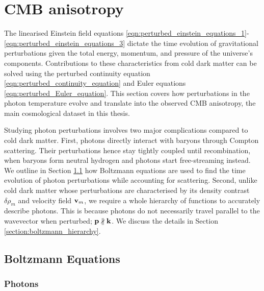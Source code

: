 \section{CMB anisotropy}

The linearised Einstein field equations \eqref{eqn:perturbed_einstein_equations_1}-\eqref{eqn:perturbed_einstein_equations_3} dictate the time evolution of gravitational perturbations given the total energy, momentum, and pressure of the universe's components. Contributions to these characteristics from cold dark matter can be solved using the perturbed continuity equation \eqref{eqn:perturbed_continuity_equation} and Euler equations \eqref{eqn:perturbed_Euler_equation}. This section covers how perturbations in the photon temperature evolve and translate into the observed CMB anisotropy, the main cosmological dataset in this thesis.

Studying photon perturbations involves two major complications compared to cold dark matter. First, photons directly interact with baryons through Compton scattering. Their perturbations hence stay tightly coupled until recombination, when baryons form neutral hydrogen and photons start free-streaming instead. We outline in Section \ref{section:boltzmann_equations} how Boltzmann equations are used to find the time evolution of photon perturbations while accounting for scattering. Second, unlike cold dark matter whose perturbations are characterised by its density contrast $\delta\rho_m$ and velocity field $\mathbf{v}_m$, we require a whole hierarchy of functions to accurately describe photons. This is because photons do not necessarily travel parallel to the wavevector when perturbed; $\mathbf{p} \nparallel \mathbf{k}$. We discuss the details in Section \ref{section:boltzmann_hierarchy}.


\subsection{Boltzmann Equations} \label{section:boltzmann_equations}
\subsubsection*{Photons}

